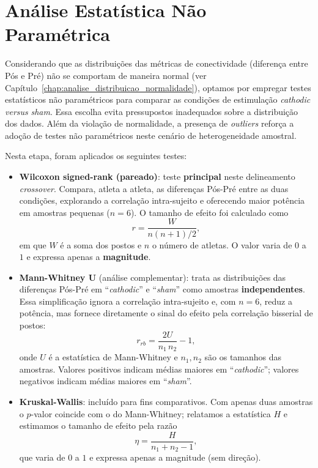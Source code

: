 \chapter{Análise Estatística Não Paramétrica}
\label{chap:analise_estatistica_np}

Considerando que as distribuições das métricas de conectividade (diferença entre Pós e Pré) não se comportam de maneira normal (ver Capítulo~\ref{chap:analise_distribuicao_normalidade}), optamos por empregar testes estatísticos não paramétricos para comparar as condições de estimulação \textit{cathodic} \textit{versus} \textit{sham}. Essa escolha evita pressupostos inadequados sobre a distribuição dos dados. Além da violação de normalidade, a presença de \textit{outliers} reforça a adoção de testes não paramétricos neste cenário de heterogeneidade amostral.

Nesta etapa, foram aplicados os seguintes testes:
\begin{itemize}
  \item \textbf{Wilcoxon signed-rank (pareado)}: teste \textbf{principal} neste delineamento \textit{crossover}. Compara, atleta a atleta, as diferenças Pós-Pré entre as duas condições, explorando a correlação intra-sujeito e oferecendo maior potência em amostras pequenas (\(n=6\)).  
        O tamanho de efeito foi calculado como
        \[
          r = \frac{W}{n(n+1)/2},
        \]
        em que \(W\) é a soma dos postos e \(n\) o número de atletas. O valor varia de \(0\) a \(1\) e expressa apenas a \textbf{magnitude}.
  \item \textbf{Mann-Whitney U} (análise complementar): trata as distribuições das diferenças Pós-Pré em ``\textit{cathodic}'' e ``\textit{sham}'' como amostras \textbf{independentes}. Essa simplificação ignora a correlação intra-sujeito e, com \(n=6\), reduz a potência, mas fornece diretamente o sinal do efeito pela correlação bisserial de postos:
        \[
          r_{rb}= \frac{2U}{n_1\,n_2}-1 ,
        \]
        onde \(U\) é a estatística de Mann-Whitney e \(n_1,n_2\) são os tamanhos das amostras. Valores positivos indicam médias maiores em ``\textit{cathodic}''; valores negativos indicam médias maiores em ``\textit{sham}''.
  \item \textbf{Kruskal-Wallis}: incluído para fins comparativos. Com apenas duas amostras o \(p\)-valor coincide com o do Mann-Whitney; relatamos a estatística \(H\) e estimamos o tamanho de efeito pela razão
        \[
          \eta = \frac{H}{n_1+n_2-1},
        \]
        que varia de \(0\) a \(1\) e expressa apenas a magnitude (sem direção).
\end{itemize}

